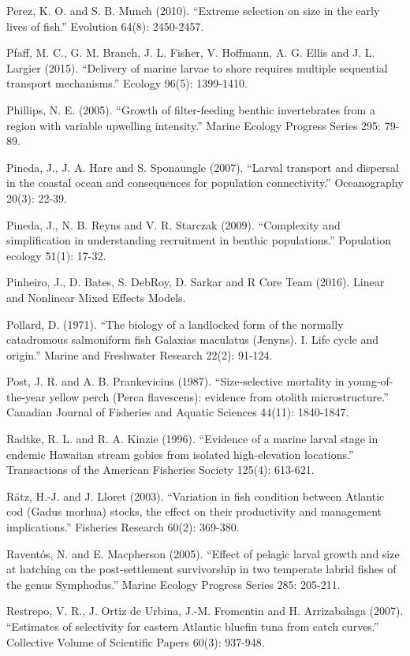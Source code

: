 \documentclass[]{book}
\begin{document}
Perez, K. O. and S. B. Munch (2010). ``Extreme selection on size in the
early lives of fish.'' Evolution 64(8): 2450-2457.

Pfaff, M. C., G. M. Branch, J. L. Fisher, V. Hoffmann, A. G. Ellis and
J. L. Largier (2015). ``Delivery of marine larvae to shore requires
multiple sequential transport mechanisms.'' Ecology 96(5): 1399-1410.

Phillips, N. E. (2005). ``Growth of filter-feeding benthic invertebrates
from a region with variable upwelling intensity.'' Marine Ecology
Progress Series 295: 79-89.

Pineda, J., J. A. Hare and S. Sponaungle (2007). ``Larval transport and
dispersal in the coastal ocean and consequences for population
connectivity.'' Oceanography 20(3): 22-39.

Pineda, J., N. B. Reyns and V. R. Starczak (2009). ``Complexity and
simplification in understanding recruitment in benthic populations.''
Population ecology 51(1): 17-32.

Pinheiro, J., D. Bates, S. DebRoy, D. Sarkar and R Core Team (2016).
Linear and Nonlinear Mixed Effects Models.

Pollard, D. (1971). ``The biology of a landlocked form of the normally
catadromous salmoniform fish Galaxias maculatus (Jenyns). I. Life cycle
and origin.'' Marine and Freshwater Research 22(2): 91-124.

Post, J. R. and A. B. Prankevicius (1987). ``Size-selective mortality in
young-of-the-year yellow perch (Perca flavescens): evidence from otolith
microstructure.'' Canadian Journal of Fisheries and Aquatic Sciences
44(11): 1840-1847.

Radtke, R. L. and R. A. Kinzie (1996). ``Evidence of a marine larval
stage in endemic Hawaiian stream gobies from isolated high-elevation
locations.'' Transactions of the American Fisheries Society 125(4):
613-621.

Rätz, H.-J. and J. Lloret (2003). ``Variation in fish condition between
Atlantic cod (Gadus morhua) stocks, the effect on their productivity and
management implications.'' Fisheries Research 60(2): 369-380.

Raventós, N. and E. Macpherson (2005). ``Effect of pelagic larval growth
and size at hatching on the post-settlement survivorship in two
temperate labrid fishes of the genus Symphodus.'' Marine Ecology
Progress Series 285: 205-211.

Restrepo, V. R., J. Ortiz de Urbina, J.-M. Fromentin and H. Arrizabalaga
(2007). ``Estimates of selectivity for eastern Atlantic bluefin tuna
from catch curves.'' Collective Volume of Scientific Papers 60(3):
937-948.
\end{document}
